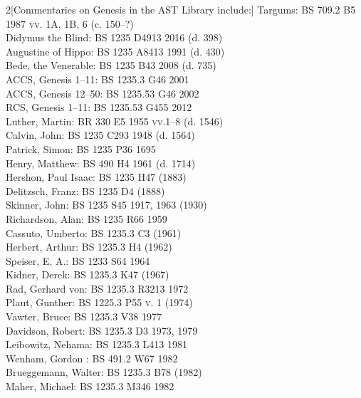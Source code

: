 \documentclass[titlepage]{article}
\begin{document}
\begin{multicols}{2}[Commentaries on Genesis in the AST Library include:]%
\footnotesize\noindent
Targums: {\scshape BS 709.2 B5 1987 vv. 1A, 1B, 6} (c. 150--?)\\
Didymus the Blind: {\scshape BS 1235 D4913 2016} (d. 398)\\
Augustine of Hippo: {\scshape BS 1235 A8413 1991} (d. 430)\\
Bede, the Venerable: {\scshape BS 1235 B43 2008} (d. 735)\\
ACCS, Genesis 1--11: {\scshape BS 1235.3 G46 2001}\\
ACCS, Genesis 12--50: {\scshape BS 1235.53 G46 2002}\\
RCS, Genesis 1--11: {\scshape BS 1235.53 G455 2012}\\
Luther, Martin: {\scshape BR 330 E5 1955 vv.1--8} (d. 1546)\\
Calvin, John: {\scshape BS 1235 C293 1948} (d. 1564)\\
Patrick, Simon: {\scshape BS 1235 P36 1695}\\
Henry, Matthew: {\scshape BS 490 H4 1961} (d. 1714)\\
Hershon, Paul Isaac: {\scshape BS 1235 H47} (1883)\\
Delitzsch, Franz: {\scshape BS 1235 D4} (1888)\\
Skinner, John: {\scshape BS 1235 S45 1917, 1963} (1930)\\
Richardson, Alan: {\scshape BS 1235 R66 1959}\\
Cassuto, Umberto: {\scshape BS 1235.3 C3} (1961)\\
Herbert, Arthur: {\scshape BS 1235.3 H4} (1962)\\
Speiser, E. A.: {\scshape BS 1233 S64 1964}\\
Kidner, Derek: {\scshape BS 1235.3 K47} (1967)\\
Rad, Gerhard von: {\scshape BS 1235.3 R3213 1972}\\
Plaut, Gunther: {\scshape BS 1225.3 P55 v. 1} (1974)\\
Vawter, Bruce: {\scshape BS 1235.3 V38 1977}\\
Davidson, Robert: {\scshape BS 1235.3 D3 1973, 1979}\\
Leibowitz, Nehama: {\scshape BS 1235.3 L413 1981}\\
Wenham, Gordon : {\scshape BS 491.2 W67 1982}\\
Brueggemann, Walter: {\scshape BS 1235.3 B78} (1982)\\
Maher, Michael: {\scshape BS 1235.3 M346 1982}\\

\end{multicols}
\end{document}
